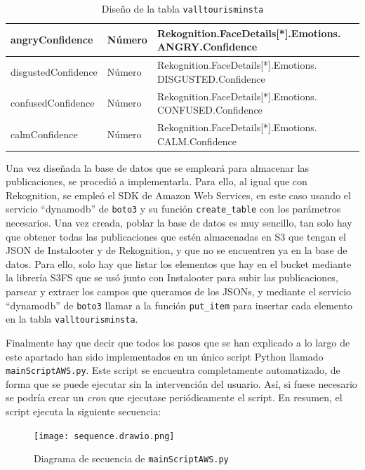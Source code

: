 \begin{table}[H]
    \centering
    \begin{tabular}{|p{}|p{}|p{}|}
    \hline
	angryConfidence & Número & Rekognition.FaceDetails{[}*{]}.Emotions. ANGRY.Confidence \\ \hline
	disgustedConfidence & Número & Rekognition.FaceDetails{[}*{]}.Emotions. DISGUSTED.Confidence \\ \hline
	confusedConfidence & Número & Rekognition.FaceDetails{[}*{]}.Emotions. CONFUSED.Confidence \\ \hline
	calmConfidence & Número & Rekognition.FaceDetails{[}*{]}.Emotions. CALM.Confidence \\ \hline
    \end{tabular}
    \caption{Diseño de la tabla \texttt{valltourisminsta}}
    \label{tab:dynamodb_table}
\end{table}

Una vez diseñada la base de datos que se empleará para almacenar las publicaciones, se procedió a implementarla. Para ello, al igual que con Rekognition, se empleó el SDK de Amazon Web Services, en este caso usando el servicio ``dynamodb'' de \texttt{boto3} y su función \texttt{create\_table} con los parámetros necesarios. Una vez creada, poblar la base de datos es muy sencillo, tan solo hay que obtener todas las publicaciones que estén almacenadas en S3 que tengan el JSON de Instalooter y de Rekognition, y que no se encuentren ya en la base de datos. Para ello, solo hay que listar los elementos que hay en el bucket mediante la librería S3FS que se usó junto con Instalooter para subir las publicaciones, parsear y extraer los campos que queramos de los JSONs, y mediante el servicio ``dynamodb'' de \texttt{boto3} llamar a la función \texttt{put\_item} para insertar cada elemento en la tabla \texttt{valltourisminsta}.

Finalmente hay que decir que todos los pasos que se han explicado a lo largo de este apartado han sido implementados en un único script Python llamado \texttt{mainScriptAWS.py}. Este script se encuentra completamente automatizado, de forma que se puede ejecutar sin la intervención del usuario. Así, si fuese necesario se podría crear un \textit{cron} que ejecutase periódicamente el script. En resumen, el script ejecuta la siguiente secuencia:

\begin{figure}[H]
    \hspace*{-2cm}
    \centering
    \texttt{[image: sequence.drawio.png]}
    \caption{Diagrama de secuencia de \texttt{mainScriptAWS.py}}
    \label{fig:sequence_script}
\end{figure}


